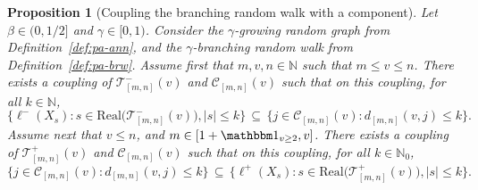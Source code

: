\documentclass[a4paper, a4wide, 10pt, reqno]{amsart}
\theoremstyle{plain}
\newtheorem{proposition}[theorem]{Proposition}
\theoremstyle{definition}
\numberwithin{equation}{section}
\newcommand{\N}{{\mathbb N}}
\newcommand{\sC}{{\mathscr C}}
\newcommand{\sT}{{\mathscr T}}
\begin{document}
\begin{proposition}[Coupling the branching random walk with a component]\label{prop:domination-upper}
Let $\beta\in(0,1/2]$ and $\gamma\in[0,1)$. Consider the  $\gamma$-growing random graph from Definition~\ref{def:pa-ann}, and the $\gamma$-branching random walk from Definition~\ref{def:pa-brw}. Assume first that $m, v, n\in\N$ such that $m\le v\le n$. There exists a coupling of $\sT^-_{[m,n]}(v)$ and $\sC_{[m,n]}(v)$ such that on this coupling, for all $k\in\N$,
\begin{equation}\label{eq:coupling-lower}
\big\{\ell^-(X_s): s\in\mathrm{Real}\big(\sT^-_{[m,n]}(v)\big), |s|\le k\big\}\, \subseteq\, 
			\{j\in \sC_{[m,n]}(v): d_{[m,n]}(v, j)\le k\}.
\end{equation}
Assume next that $v\le n$, and $m\in[1+\mathbbm1_{v\ge2}, v]$.
There exists a coupling of $\sT^+_{[m,n]}(v)$ and $\sC_{[m,n]}(v)$ such that on this coupling, for all $k\in\N_0$,	
	\begin{equation}\label{eq:coupling-upper}
			\{j\in \sC_{[m,n]}(v): d_{[m,n]}(v, j)\le k\}                                       \, \subseteq\,  \big\{\ell^+( X_s): s\in\mathrm{Real}\big(\sT^+_{[m,n]}(v)\big), |s|\le k\big\}.\end{equation}
\end{proposition}
\end{document}
